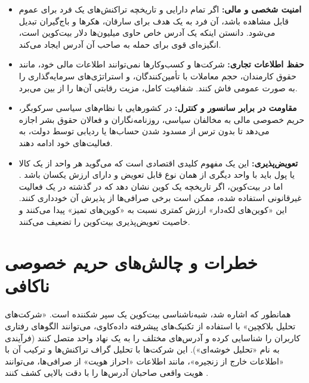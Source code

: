 \begin{itemize}
	\item \textbf{امنیت شخصی و مالی:} اگر تمام دارایی و تاریخچه تراکنش‌های یک فرد برای عموم قابل مشاهده باشد، آن فرد به یک هدف برای سارقان، هکرها و باج‌گیران تبدیل می‌شود. دانستن اینکه یک آدرس خاص حاوی میلیون‌ها دلار بیت‌کوین است، انگیزه‌ای قوی برای حمله به صاحب آن آدرس ایجاد می‌کند.
	
	\item \textbf{حفظ اطلاعات تجاری:} شرکت‌ها و کسب‌وکارها نمی‌توانند اطلاعات مالی خود، مانند حقوق کارمندان، حجم معاملات با تأمین‌کنندگان، و استراتژی‌های سرمایه‌گذاری را به صورت عمومی فاش کنند. شفافیت کامل، مزیت رقابتی آن‌ها را از بین می‌برد.
	
	\item \textbf{مقاومت در برابر سانسور و کنترل:} در کشورهایی با نظام‌های سیاسی سرکوبگر، حریم خصوصی مالی به مخالفان سیاسی، روزنامه‌نگاران و فعالان حقوق بشر اجازه می‌دهد تا بدون ترس از مسدود شدن حساب‌ها یا ردیابی توسط دولت، به فعالیت‌های خود ادامه دهند.
	
	\item \textbf{تعویض‌پذیری:} این یک مفهوم کلیدی اقتصادی است که می‌گوید هر واحد از یک کالا یا پول باید با واحد دیگری از همان نوع قابل تعویض و دارای ارزش یکسان باشد \cite{antonopoulos_mastering}. اما در بیت‌کوین، اگر تاریخچه یک کوین نشان دهد که در گذشته در یک فعالیت غیرقانونی استفاده شده، ممکن است برخی صرافی‌ها از پذیرش آن خودداری کنند. این «کوین‌های لکه‌دار» ارزش کمتری نسبت به «کوین‌های تمیز» پیدا می‌کنند و خاصیت تعویض‌پذیری بیت‌کوین را تضعیف می‌کنند.
\end{itemize}

\section{خطرات و چالش‌های حریم خصوصی ناکافی}

همانطور که اشاره شد، شبه‌ناشناسی بیت‌کوین یک سپر شکننده است. «شرکت‌های تحلیل بلاکچین» با استفاده از تکنیک‌های پیشرفته داده‌کاوی، می‌توانند الگوهای رفتاری کاربران را شناسایی کرده و آدرس‌های مختلف را به یک نهاد واحد متصل کنند (فرآیندی به نام «تحلیل خوشه‌ای»). این شرکت‌ها با تحلیل گراف تراکنش‌ها و ترکیب آن با «اطلاعات خارج از زنجیره»، مانند اطلاعات «احراز هویت» از صرافی‌ها، می‌توانند هویت واقعی صاحبان آدرس‌ها را با دقت بالایی کشف کنند \cite{narayanan_deanonymizing}.

